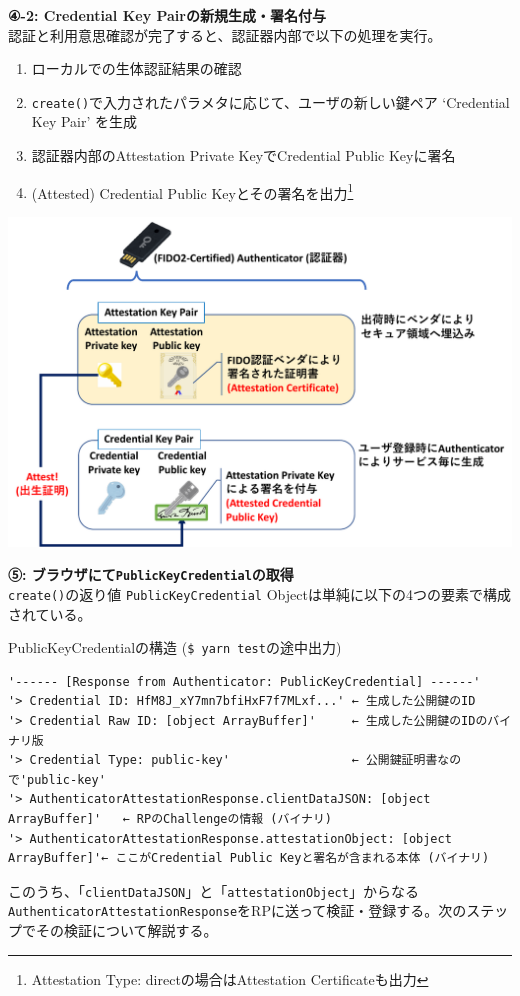\documentclass[12pt,dvipdfmx,uplatex]{beamer}
\begin{document}
\begin{frame}
\textbf{④-2: Credential Key Pairの新規生成・署名付与}\\[2ex]

\small
認証と利用意思確認が完了すると、認証器内部で以下の処理を実行。
\begin{enumerate}
\setlength{\itemsep}{0ex}
 \item ローカルでの生体認証結果の確認
 \item \texttt{create()}で入力されたパラメタに応じて、ユーザの新しい鍵ペア `Credential Key Pair' を生成
 \item 認証器内部のAttestation Private KeyでCredential Public Keyに署名
 \item (Attested) Credential Public Keyとその署名を出力\footnote[frame]{\scriptsize Attestation Type: directの場合はAttestation Certificateも出力}
\end{enumerate}
\begin{center}
\includegraphics[width=0.5\linewidth]{Figs/webauthn-attestation.pdf}
\end{center}
\end{frame}

\begin{frame}[fragile]
\small
\textbf{⑤: ブラウザにて\texttt{PublicKeyCredential}の取得}\\[2ex]

\texttt{create()}の返り値 \texttt{PublicKeyCredential} Objectは単純に以下の4つの要素で構成されている。
\begin{exampleblock}{\scriptsize PublicKeyCredentialの構造 (\texttt{\$ yarn test}の途中出力)}
{\tiny
\begin{verbatim}
'------ [Response from Authenticator: PublicKeyCredential] ------'
'> Credential ID: HfM8J_xY7mn7bfiHxF7f7MLxf...' ← 生成した公開鍵のID
'> Credential Raw ID: [object ArrayBuffer]'     ← 生成した公開鍵のIDのバイナリ版
'> Credential Type: public-key'                 ← 公開鍵証明書なので'public-key'
'> AuthenticatorAttestationResponse.clientDataJSON: [object ArrayBuffer]'   ← RPのChallengeの情報 (バイナリ)
'> AuthenticatorAttestationResponse.attestationObject: [object ArrayBuffer]'← ここがCredential Public Keyと署名が含まれる本体 (バイナリ)
\end{verbatim}
}
\end{exampleblock}

このうち、「\texttt{clientDataJSON}」と「\texttt{attestationObject}」からなる\texttt{AuthenticatorAttestationResponse}をRPに送って検証・登録する。次のステップでその検証について解説する。


\end{frame}
\end{document}

